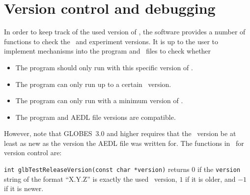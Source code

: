 \section{Version control and debugging}
\label{sec:versioning}

In order to keep track of the used version of \GLOBES , the software
provides a number of functions to check the \GLOBES\ and experiment
versions. It is up to the user to implement mechanisms into the
program and \AEDL\ files to check whether
\begin{itemize}
\item
 The program should only run with this specific version of \GLOBES .
\item
 The program can only run up to a certain \GLOBES\ version.
\item
 The program can only run with a minimum version of \GLOBES .
\item
 The program and AEDL file versions are compatible.
\end{itemize}
However, note that GLOBES~3.0 and higher requires that the \GLOBES\ version be at least as new as the
version the AEDL file was written for.
%
The functions in \GLOBES\ for version control are:
\begin{function}
{\tt int glbTestReleaseVersion(const char *version)} returns $0$ if
the {\tt version} string of the format ``X.Y.Z'' is exactly the
used \GLOBES\ version, $1$ if it is older, and $-1$ if it is newer. 
\end{function}

